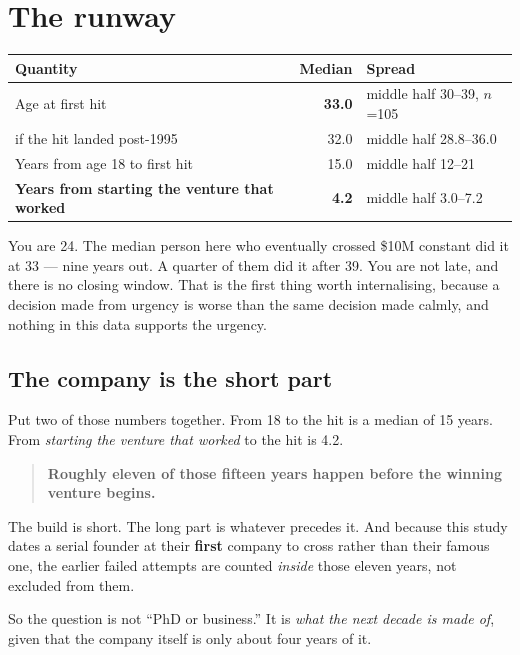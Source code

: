 \documentclass[11pt]{article}
\begin{document}
\section{The runway}

\begin{table}[h]
\centering
\begin{tabular}{lrl}
\toprule
Quantity & Median & Spread \\
\midrule
Age at first hit & \textbf{33.0} & middle half 30--39, $n$=105 \\
\quad if the hit landed post-1995 & 32.0 & middle half 28.8--36.0 \\
Years from age 18 to first hit & 15.0 & middle half 12--21 \\
\textbf{Years from starting the venture that worked} & \textbf{4.2} & middle half 3.0--7.2 \\
\bottomrule
\end{tabular}
\end{table}

You are 24. The median person here who eventually crossed \$10M constant did it
at 33 --- nine years out. A quarter of them did it after 39. You are not late,
and there is no closing window. That is the first thing worth internalising,
because a decision made from urgency is worse than the same decision made
calmly, and nothing in this data supports the urgency.

\subsection{The company is the short part}

Put two of those numbers together. From 18 to the hit is a median of 15 years.
From \emph{starting the venture that worked} to the hit is 4.2.

\begin{quote}
\textbf{Roughly eleven of those fifteen years happen before the winning venture
begins.}
\end{quote}

The build is short. The long part is whatever precedes it. And because this
study dates a serial founder at their \textbf{first} company to cross rather
than their famous one, the earlier failed attempts are counted \emph{inside}
those eleven years, not excluded from them.

So the question is not ``PhD or business.'' It is \emph{what the next decade is
made of}, given that the company itself is only about four years of it.
\end{document}
